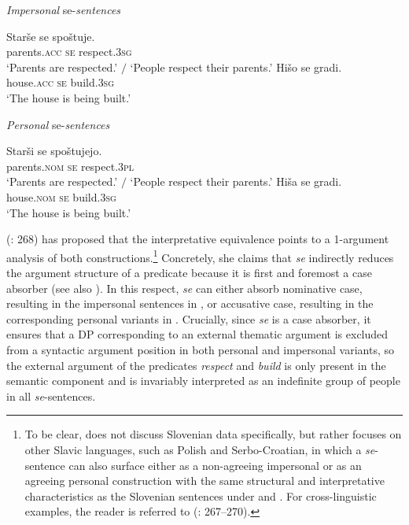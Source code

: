 \documentclass[output=paper,
modfonts,nonflat,
newtxmath
]{langsci/langscibook}
\begin{document}
\begin{exe}
\ex \textit{Impersonal} se-\textit{sentences}  \label{ex:lenardic: 2}
\begin{xlist}
\ex \gll Starše se spoštuje.\\
parents.\textsc{acc} \textsc{se} respect.\textsc{3sg}\\
\trans `Parents are respected.' $/$ `People respect their parents.'
\ex \gll Hišo se gradi.\\
house.\textsc{acc} \textsc{se} build.\textsc{3sg}\\
\trans `The house is being built.'
\end{xlist}
\ex \textit{Personal} se-\textit{sentences} \label{ex:lenardic: 3}
\begin{xlist}
\ex \gll Starši se spoštujejo.\\
parents.\textsc{nom} \textsc{se} respect.\textsc{3pl}\\
\trans `Parents are respected.' $/$ `People respect their parents.'
\ex \gll Hiša se gradi.\\
house.\textsc{nom} \textsc{se} build.\textsc{3sg}\\
\trans `The house is being built.'
\end{xlist}
\end{exe} 
\par

\noindent \citeauthor{marelj2004} (\citeyear{marelj2004}: 268) has proposed that the interpretative equivalence points to a 1-argument analysis of both constructions.\footnote{To be clear, \citet{marelj2004} does not discuss Slovenian data specifically, but rather focuses on other Slavic languages, such as Polish and Serbo-Croatian, in which a \textit{se}-sentence can also surface either as a non-agreeing impersonal or as an agreeing personal construction with the same structural and interpretative characteristics as the Slovenian sentences under  and . For cross-linguistic examples, the reader is referred to \citeauthor{marelj2004} (\citeyear{marelj2004}: 267--270).} Concretely, she claims that \textit{se} indirectly reduces the argument structure of a predicate because it is first and foremost a case absorber (see also \citealt{givon1998,franks1995}). In this respect, \textit{se} can either absorb nominative case, resulting in the impersonal sentences in , or accusative case, resulting in the corresponding personal variants in . Crucially, since \textit{se} is a case absorber, it ensures that a DP corresponding to an external thematic argument is excluded from a syntactic argument position in both personal and impersonal variants, so the external argument of the predicates \textit{respect} and \textit{build}  is only present in the semantic component and is invariably interpreted as an indefinite group of people in all \textit{se}-sentences. \par
\end{document}

